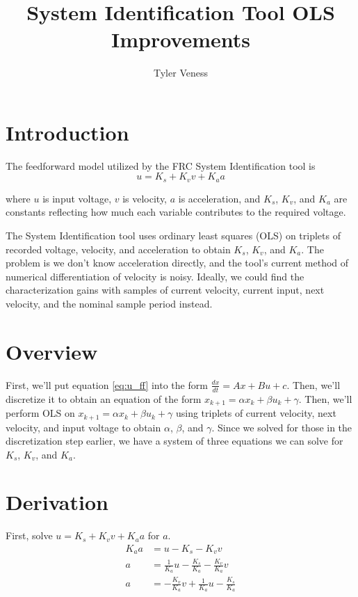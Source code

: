 \documentclass[10pt,conference,compsoc]{IEEEtran}
\begin{document}
\title{System Identification Tool OLS Improvements}
\author{Tyler Veness}
\maketitle

\section{Introduction}

The feedforward model utilized by the FRC System Identification tool is
\begin{equation}
  u = K_s + K_v v + K_a a \label{eq:u_ff}
\end{equation}

where $u$ is input voltage, $v$ is velocity, $a$ is acceleration, and $K_s$,
$K_v$, and $K_a$ are constants reflecting how much each variable contributes to
the required voltage.

The System Identification tool uses ordinary least squares (OLS) on triplets of
recorded voltage, velocity, and acceleration to obtain $K_s$, $K_v$, and $K_a$.
The problem is we don't know acceleration directly, and the tool's current
method of numerical differentiation of velocity is noisy. Ideally, we could find
the characterization gains with samples of current velocity, current input, next
velocity, and the nominal sample period instead.

\section{Overview}

First, we'll put equation \eqref{eq:u_ff} into the form
$\frac{dx}{dt} = Ax + Bu + c$. Then, we'll discretize it to obtain an equation
of the form $x_{k+1} = \alpha x_k + \beta u_k + \gamma$. Then, we'll perform OLS
on $x_{k+1} = \alpha x_k + \beta u_k + \gamma$ using triplets of current
velocity, next velocity, and input voltage to obtain $\alpha$, $\beta$, and
$\gamma$. Since we solved for those in the discretization step earlier, we have
a system of three equations we can solve for $K_s$, $K_v$, and $K_a$.

\section{Derivation}

First, solve $u = K_s + K_v v + K_a a$ for $a$.
\begin{align*}
  K_a a &= u - K_s - K_v v \\
  a &= \frac{1}{K_a} u - \frac{K_s}{K_a} - \frac{K_v}{K_a} v \\
  a &= -\frac{K_v}{K_a} v + \frac{1}{K_a} u - \frac{K_s}{K_a}
\end{align*}
\end{document}
